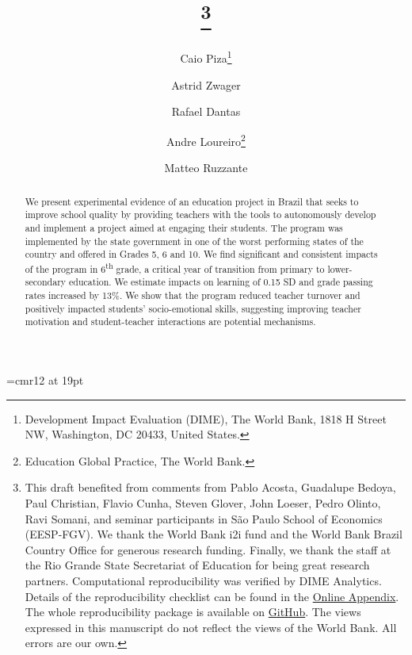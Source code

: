 \documentclass[11pt,a4paper]{article}
\begin{document}

\font\myfont=cmr12 at 19pt
\title{\thanks{This draft benefited from comments from Pablo Acosta, Guadalupe Bedoya, Paul Christian, Flavio Cunha, Steven Glover, John Loeser, Pedro Olinto, Ravi Somani, and seminar participants in São Paulo School of Economics (EESP-FGV). We thank the World Bank i2i fund and the World Bank Brazil Country Office for generous  research  funding. Finally, we thank the staff at the Rio Grande State Secretariat of Education for being great research partners. Computational reproducibility was verified by DIME Analytics. Details of the reproducibility checklist can be found in the \href{https://github.com/worldbank/brazil-pip-education/pip-app.pdf}{Online Appendix}. The whole reproducibility package is available on \href{https://github.com/worldbank/brazil-pip-education}{GitHub}. The views expressed in this manuscript do not reflect the views of the World Bank. All errors are our own.}}

\newcommand*\samethanks[1][\value{footnote}]{\footnotemark[#1]}

\author{%
    Caio Piza\thanks{Development Impact Evaluation (DIME), The World Bank, 1818 H Street NW, Washington, DC 20433, United States.}%
    \and Astrid Zwager\samethanks[2]%
    \and Rafael Dantas\samethanks[2]%
    \and Andre Loureiro\thanks{Education Global Practice, The World Bank.}%
    \and Matteo Ruzzante\samethanks[2]
}


\date{}

\maketitle

\begin{abstract}
    \noindent We present experimental evidence of an education project in Brazil that seeks to improve school quality by providing teachers with the tools to autonomously develop and implement a project aimed at engaging their students. The program was implemented by the state government in one of the worst performing states of the country and offered in Grades 5, 6 and 10. We find significant and consistent impacts of the program in 6\textsuperscript{th} grade, a critical year of transition from primary to lower-secondary education. We estimate impacts on learning of 0.15 SD and grade passing rates increased by 13\%. We show that the program reduced teacher turnover and positively impacted students' socio-emotional skills, suggesting improving teacher motivation and student-teacher interactions are potential mechanisms.   
\end{abstract}
\end{document}
